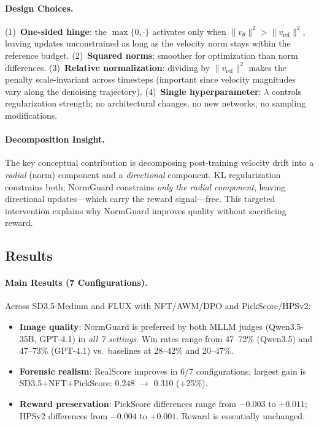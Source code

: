 \documentclass[11pt,a4paper]{article}
\begin{document}
\paragraph{Design Choices.} (1)~\textbf{One-sided hinge}: the $\max\{0,\cdot\}$ activates only when $\|v_\theta\|^2 > \|v_{\mathrm{ref}}\|^2$, leaving updates unconstrained as long as the velocity norm stays within the reference budget. (2)~\textbf{Squared norms}: smoother for optimization than norm differences. (3)~\textbf{Relative normalization}: dividing by $\|v_{\mathrm{ref}}\|^2$ makes the penalty scale-invariant across timesteps (important since velocity magnitudes vary along the denoising trajectory). (4)~\textbf{Single hyperparameter}: $\lambda$ controls regularization strength; no architectural changes, no new networks, no sampling modifications.

\paragraph{Decomposition Insight.} The key conceptual contribution is decomposing post-training velocity drift into a \emph{radial} (norm) component and a \emph{directional} component. KL regularization constrains both; NormGuard constrains \emph{only the radial component}, leaving directional updates---which carry the reward signal---free. This targeted intervention explains why NormGuard improves quality without sacrificing reward.

\subsection{Results}

\paragraph{Main Results (7 Configurations).} Across SD3.5-Medium and FLUX with NFT/AWM/DPO and PickScore/HPSv2:
\begin{itemize}
\item \textbf{Image quality}: NormGuard is preferred by both MLLM judges (Qwen3.5-35B, GPT-4.1) in \emph{all 7 settings}. Win rates range from 47--72\% (Qwen3.5) and 47--73\% (GPT-4.1) vs.\ baselines at 28--42\% and 20--47\%.
\item \textbf{Forensic realism}: RealScore improves in 6/7 configurations; largest gain is SD3.5+NFT+PickScore: 0.248 $\to$ 0.310 (+25\%).
\item \textbf{Reward preservation}: PickScore differences range from $-0.003$ to $+0.011$; HPSv2 differences from $-0.004$ to $+0.001$. Reward is essentially unchanged.
\end{itemize}
\end{document}
